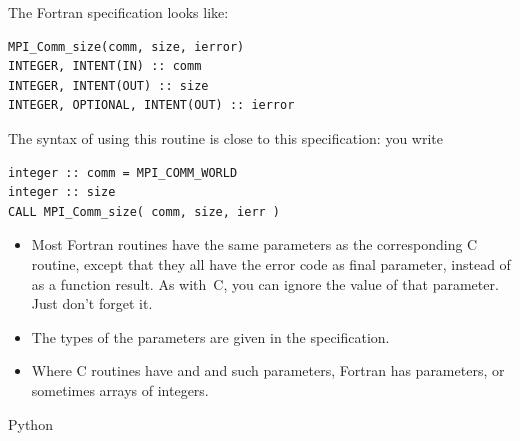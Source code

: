 The Fortran specification looks like:
\lstset{language=Fortran} %
\begin{lstlisting}
MPI_Comm_size(comm, size, ierror)
INTEGER, INTENT(IN) :: comm
INTEGER, INTENT(OUT) :: size
INTEGER, OPTIONAL, INTENT(OUT) :: ierror
\end{lstlisting}
The syntax of using this routine is close to this specification: you
write
\begin{lstlisting}
integer :: comm = MPI_COMM_WORLD
integer :: size
CALL MPI_Comm_size( comm, size, ierr )
\end{lstlisting}
\lstset{language=C} %

\begin{itemize}
\item Most Fortran routines have the same parameters as the
  corresponding C routine, except that they all have the error code as
  final parameter, instead of as a function result. As with~C, you can
  ignore the value of that parameter. Just don't forget it.
\item The types of the parameters are given in the specification.
\item Where C routines have  and  and such
  parameters, Fortran has  parameters, or sometimes arrays
  of integers.
\end{itemize}

 {Python}


